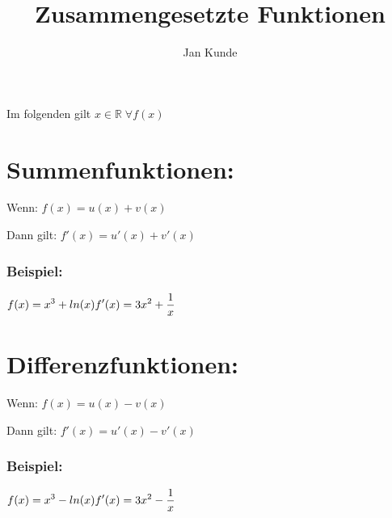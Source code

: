 \documentclass{article}
\title{Zusammengesetzte Funktionen}
\author{Jan Kunde}
\date{}
\begin{document}
\maketitle
\begin{center}
    Im folgenden gilt \begin{math} {\displaystyle x \in \mathbb{R} \; \forall f(x)} \end{math}
\end{center}
\raggedright
    \section*{Summenfunktionen:}
        Wenn: \break
        \begin{math}
                {\displaystyle f(x) = u(x) + v(x)}
        \end{math}

        Dann gilt:\break
            \begin{math}
                 {\displaystyle f'(x) = u'(x) + v'(x)}
            \end{math}
        

        \subsubsection*{Beispiel:}
            \begin{math}
                {\displaystyle f(x) = x^3 + ln(x)} \break\break
                {\displaystyle f'(x) = 3x^2+\frac{1}{x}}
            \end{math}

    \section*{Differenzfunktionen:}
    Wenn: \break
    \begin{math}
            {\displaystyle f(x) = u(x) - v(x)}
    \end{math}

    Dann gilt:\break
        \begin{math}
            {\displaystyle f'(x) = u'(x) - v'(x)}
        \end{math}
    

    \subsubsection*{Beispiel:}
        \begin{math}
            {\displaystyle f(x) = x^3 - ln(x)} \break\break
            {\displaystyle f'(x) = 3x^2 - \frac{1}{x}}
        \end{math}
\end{document}
